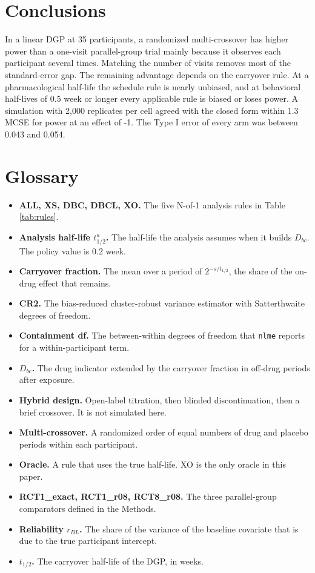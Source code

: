 \documentclass[
  11pt,
]{article}
\providecommand{\tightlist}{%
  \setlength{\itemsep}{0pt}\setlength{\parskip}{0pt}}
\begin{document}
\section{Conclusions}\label{conclusions}

In a linear DGP at 35 participants, a randomized multi-crossover has higher power than a one-visit parallel-group trial mainly because it observes each participant several times. Matching the number of visits removes most of the standard-error gap. The remaining advantage depends on the carryover rule. At a pharmacological half-life the schedule rule is nearly unbiased, and at behavioral half-lives of 0.5 week or longer every applicable rule is biased or loses power. A simulation with 2,000 replicates per cell agreed with the closed form within 1.3 MCSE for power at an effect of -1. The Type I error of every arm was between 0.043 and 0.054.

\section{Glossary}\label{glossary}

\begin{itemize}
\tightlist
\item
  \textbf{ALL, XS, DBC, DBCL, XO.} The five N-of-1 analysis rules in Table \ref{tab:rules}.
\item
  \textbf{Analysis half-life \(t_{1/2}^a\).} The half-life the analysis assumes when it builds \(D_{bc}\). The policy value is 0.2 week.
\item
  \textbf{Carryover fraction.} The mean over a period of \(2^{-s/t_{1/2}}\), the share of the on-drug effect that remains.
\item
  \textbf{CR2.} The bias-reduced cluster-robust variance estimator with Satterthwaite degrees of freedom.
\item
  \textbf{Containment df.} The between-within degrees of freedom that \texttt{nlme} reports for a within-participant term.
\item
  \textbf{\(D_{bc}\).} The drug indicator extended by the carryover fraction in off-drug periods after exposure.
\item
  \textbf{Hybrid design.} Open-label titration, then blinded discontinuation, then a brief crossover. It is not simulated here.
\item
  \textbf{Multi-crossover.} A randomized order of equal numbers of drug and placebo periods within each participant.
\item
  \textbf{Oracle.} A rule that uses the true half-life. XO is the only oracle in this paper.
\item
  \textbf{RCT1\_exact, RCT1\_r08, RCT8\_r08.} The three parallel-group comparators defined in the Methods.
\item
  \textbf{Reliability \(r_{BL}\).} The share of the variance of the baseline covariate that is due to the true participant intercept.
\item
  \textbf{\(t_{1/2}\).} The carryover half-life of the DGP, in weeks.
\end{itemize}
\end{document}

